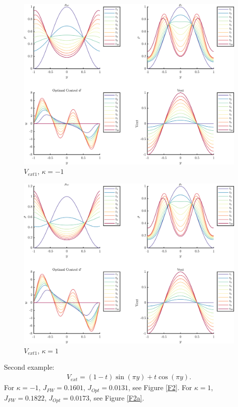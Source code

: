 \documentclass[11pt, a4paper]{article}
\theoremstyle{definition}
\begin{document}
\begin{figure}[h]
	\centering
	\includegraphics[scale=0.055]{Vext1n1.png}
	\caption{$V_{ext1}$, $\kappa = -1$} 
	\label{F1}
\end{figure}
\begin{figure}[h]
	\centering
	\includegraphics[scale=0.055]{Vext11.png}
	\caption{$V_{ext1}$, $\kappa = 1$} 
	\label{F1a}
\end{figure}

Second example:
\begin{align*}
V_{ext} = (1-t)\sin(\pi y) + t\cos(\pi y).
\end{align*}
For $\kappa = -1$, $J_{FW} = 0.1601$, $J_{Opt} = 0.0131$, see Figure \ref{F2}.
For $\kappa = 1$, $J_{FW} = 0.1822$, $J_{Opt} = 0.0173$, see Figure \ref{F2a}.
\end{document}
